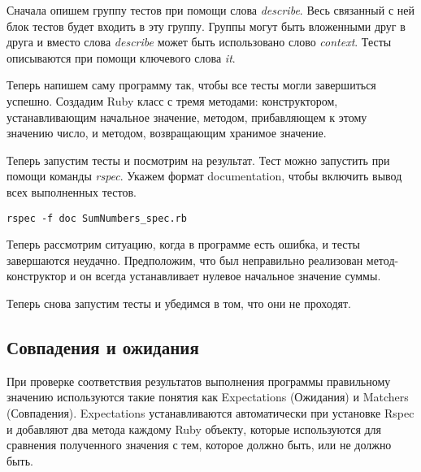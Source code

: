 Сначала опишем группу тестов при помощи слова \emph{describe}. Весь связанный с ней блок тестов будет входить в эту группу. Группы могут быть вложенными друг в друга и вместо слова \emph{describe} может быть использовано слово \emph{context}. Тесты описываются при помощи ключевого слова \emph{it}.



Теперь напишем саму программу так, чтобы все тесты могли завершиться успешно. Создадим Ruby класс с тремя методами: конструктором, устанавливающим начальное значение, методом, прибавляющем к этому значению число, и методом, возвращающим хранимое значение.



Теперь запустим тесты и посмотрим на результат. Тест можно запустить при помощи команды \emph{rspec}. Укажем формат documentation, чтобы включить вывод всех выполненных тестов.

\begin{verbatim}
rspec -f doc SumNumbers_spec.rb
\end{verbatim}


Теперь рассмотрим ситуацию, когда в программе есть ошибка, и тесты завершаются неудачно. Предположим, что был неправильно реализован метод-конструктор и он всегда устанавливает нулевое начальное значение суммы.



Теперь снова запустим тесты и убедимся в том, что они не проходят.


\subsection{Совпадения и ожидания}

При проверке соответствия результатов выполнения программы правильному значению используются такие понятия как Expectations (Ожидания) и Matchers (Совпадения). Expectations устанавливаются автоматически при установке Rspec и добавляют два метода каждому Ruby объекту, которые используются для сравнения полученного значения с тем, которое должно быть, или не должно быть.

